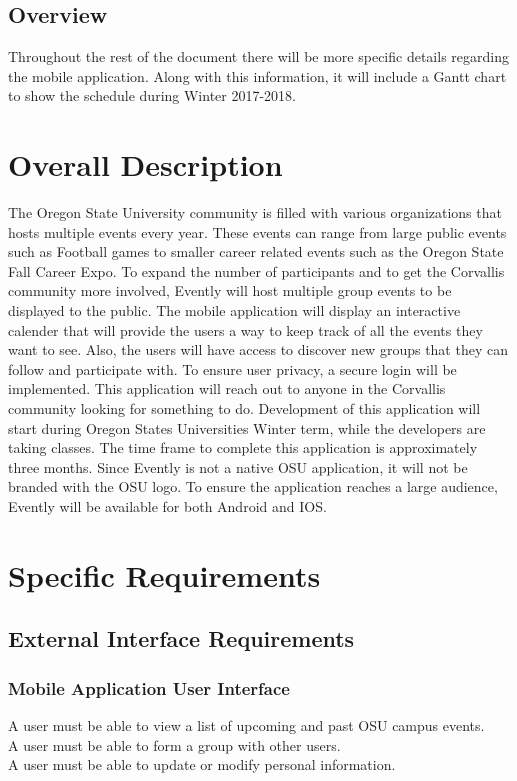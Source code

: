 \documentclass[letterpaper, 10pt,titlepage]{article}
\begin{document}

\subsection{Overview}
Throughout the rest of the document there will be more specific details regarding the mobile application. Along with this information, it will include a Gantt chart to show the schedule during Winter 2017-2018.


\section{Overall Description}
The Oregon State University community is filled with various organizations that hosts multiple events every year. These events can range from large public events such as Football games to smaller career related events such as the Oregon State Fall Career Expo. To expand the number of participants and to get the Corvallis community more involved, Evently will host multiple group events to be displayed to the public. The mobile application will display an interactive calender that will provide the users a way to keep track of all the events they want to see. Also, the users will have access to discover new groups that they can follow and participate with. To ensure user privacy, a secure login will be implemented. This application will reach out to anyone in the Corvallis community looking for something to do. Development of this application will start during Oregon States Universities Winter term, while the developers are taking classes. The time frame to complete this application is approximately three months. Since Evently is not a native OSU application, it will not be branded with the OSU logo. To ensure the application reaches a large audience, Evently will be available for both Android and IOS. 
\section{Specific Requirements}
\subsection{External Interface Requirements}
\subsubsection{Mobile Application User Interface}
A user must be able to view a list of upcoming and past OSU campus events. \\
A user must be able to form a group with other users.\\
A user must be able to update or modify personal information.
\end{document}
